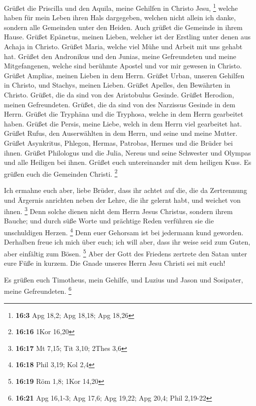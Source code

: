  Grüßet die Priscilla und den Aquila, meine Gehilfen in
Christo Jesu, \footnote{\textbf{16:3} Apg 18,2; Apg 18,18; Apg 18,26}
 welche haben für mein Leben ihren Hals dargegeben, welchen
nicht allein ich danke, sondern alle Gemeinden unter den Heiden.
 Auch grüßet die Gemeinde in ihrem Hause. Grüßet Epänetus,
meinen Lieben, welcher ist der Erstling unter denen aus Achaja in
Christo.  Grüßet Maria, welche viel Mühe und Arbeit mit uns
gehabt hat.  Grüßet den Andronikus und den Junias, meine
Gefreundeten und meine Mitgefangenen, welche sind berühmte Apostel und
vor mir gewesen in Christo.  Grüßet Amplias, meinen Lieben
in dem Herrn.  Grüßet Urban, unseren Gehilfen in Christo,
und Stachys, meinen Lieben.  Grüßet Apelles, den Bewährten
in Christo. Grüßet, die da sind von des Aristobulus Gesinde.
 Grüßet Herodion, meinen Gefreundeten. Grüßet, die da sind
von des Narzissus Gesinde in dem Herrn.  Grüßet die
Tryphäna und die Tryphosa, welche in dem Herrn gearbeitet haben. Grüßet
die Persis, meine Liebe, welch in dem Herrn viel gearbeitet hat.
 Grüßet Rufus, den Auserwählten in dem Herrn, und seine und
meine Mutter.  Grüßet Asynkritus, Phlegon, Hermas,
Patrobas, Hermes und die Brüder bei ihnen.  Grüßet
Philologus und die Julia, Nereus und seine Schwester und Olympas und
alle Heiligen bei ihnen.  Grüßet euch untereinander mit dem
heiligen Kuss. Es grüßen euch die Gemeinden Christi. \footnote{\textbf{16:16}
  1Kor 16,20}

 Ich ermahne euch aber, liebe Brüder, dass ihr achtet auf
die, die da Zertrennung und Ärgernis anrichten neben der Lehre, die ihr
gelernt habt, und weichet von ihnen. \footnote{\textbf{16:17} Mt 7,15;
  Tit 3,10; 2Thes 3,6}  Denn solche dienen nicht dem Herrn
Jesus Christus, sondern ihrem Bauche; und durch süße Worte und prächtige
Reden verführen sie die unschuldigen Herzen. \footnote{\textbf{16:18}
  Phil 3,19; Kol 2,4}  Denn euer Gehorsam ist bei jedermann
kund geworden. Derhalben freue ich mich über euch; ich will aber, dass
ihr weise seid zum Guten, aber einfältig zum Bösen. \footnote{\textbf{16:19}
  Röm 1,8; 1Kor 14,20}  Aber der Gott des Friedens zertrete
den Satan unter eure Füße in kurzem. Die Gnade unseres Herrn Jesu
Christi sei mit euch!

 Es grüßen euch Timotheus, mein Gehilfe, und Luzius und
Jason und Sosipater, meine Gefreundeten. \footnote{\textbf{16:21} Apg
  16,1-3; Apg 17,6; Apg 19,22; Apg 20,4; Phil 2,19-22}

